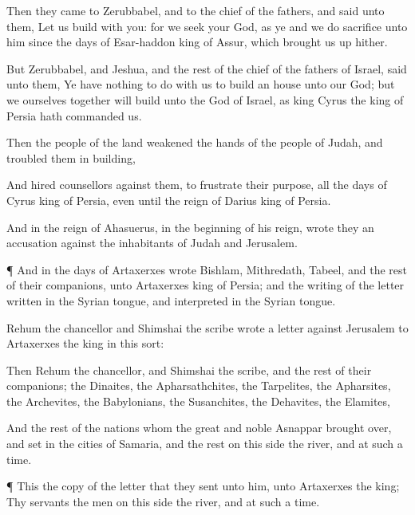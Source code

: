 {Then they
came to
Zerubbabel, and to the
chief of the
fathers, and
said unto them, Let us
build with you: for we
seek your
God, as ye
{} and we do
sacrifice unto him since the
days of
Esar-haddon
king of
Assur, which brought us up
hither.

But
Zerubbabel, and
Jeshua, and the
rest of the
chief of the
fathers of
Israel,
said unto them, Ye have nothing to do with us to
build an
house unto our
God; but we ourselves
together will
build unto the
{}
God of
Israel, as
king
Cyrus the
king of
Persia hath
commanded us.

Then the
people of the
land
weakened the
hands of the
people of
Judah, and
troubled them in
building,

And
hired
counsellors against them, to
frustrate their
purpose, all the
days of
Cyrus
king of
Persia, even until the
reign of
Darius
king of
Persia.


\par }{\PP {}And in the
reign of
Ahasuerus, in the
beginning of his
reign,
wrote they
{} an
accusation against the
inhabitants of
Judah and
Jerusalem.


\par }{\PP {}¶ And in the
days of
Artaxerxes
wrote
Bishlam,
Mithredath,
Tabeel, and the
rest of their
companions, unto
Artaxerxes
king of
Persia; and the
writing of the
letter
{}
written in the Syrian
tongue, and
interpreted in the Syrian
tongue.

Rehum the
chancellor and
Shimshai the
scribe
wrote
a
letter
against
Jerusalem to
Artaxerxes the
king in this
sort:

Then
{}
Rehum the
chancellor, and
Shimshai the
scribe, and the
rest of their
companions; the
Dinaites, the
Apharsathchites, the
Tarpelites, the
Apharsites, the
Archevites, the
Babylonians, the
Susanchites, the
Dehavites,
{} the
Elamites,

And the
rest of the
nations
whom the
great and
noble
Asnappar brought
over, and
set in the
cities of
Samaria, and the
rest
{} on this
side the
river, and at such a
time.


\par }{\PP {}¶
This
{} the
copy of the
letter
that they
sent unto
him,
{} unto
Artaxerxes the
king; Thy
servants the
men on this
side the
river, and at such a
time.

}
